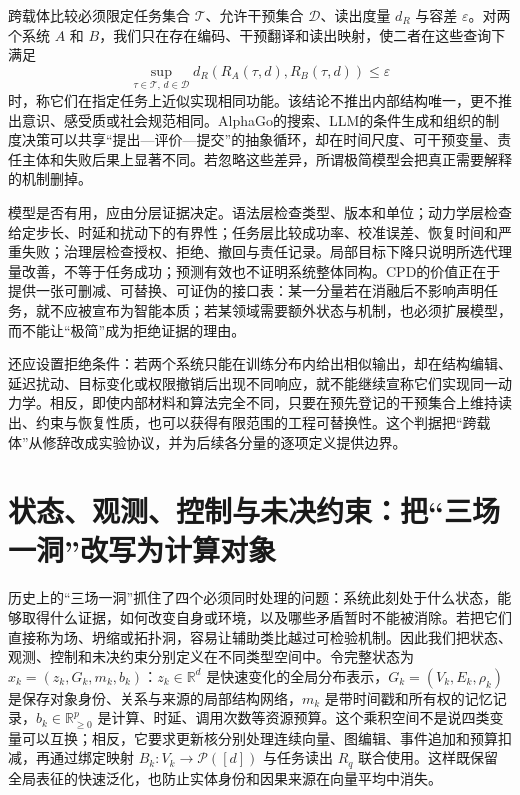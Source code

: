 跨载体比较必须限定任务集合 $\mathcal{T}$、允许干预集合 $\mathcal{D}$、读出度量 $d_R$ 与容差 $\varepsilon$。对两个系统 $A$ 和 $B$，我们只在存在编码、干预翻译和读出映射，使二者在这些查询下满足
\[
  \sup_{\tau\in\mathcal{T},\,d\in\mathcal{D}}
  d_R\!\left(R_A(\tau,d),R_B(\tau,d)\right)\leq\varepsilon
\]
时，称它们在指定任务上近似实现相同功能。该结论不推出内部结构唯一，更不推出意识、感受质或社会规范相同。AlphaGo的搜索、LLM的条件生成和组织的制度决策可以共享“提出—评价—提交”的抽象循环，却在时间尺度、可干预变量、责任主体和失败后果上显著不同。若忽略这些差异，所谓极简模型会把真正需要解释的机制删掉。

模型是否有用，应由分层证据决定。语法层检查类型、版本和单位；动力学层检查给定步长、时延和扰动下的有界性；任务层比较成功率、校准误差、恢复时间和严重失败；治理层检查授权、拒绝、撤回与责任记录。局部目标下降只说明所选代理量改善，不等于任务成功；预测有效也不证明系统整体同构。CPD的价值正在于提供一张可删减、可替换、可证伪的接口表：某一分量若在消融后不影响声明任务，就不应被宣布为智能本质；若某领域需要额外状态与机制，也必须扩展模型，而不能让“极简”成为拒绝证据的理由。

还应设置拒绝条件：若两个系统只能在训练分布内给出相似输出，却在结构编辑、延迟扰动、目标变化或权限撤销后出现不同响应，就不能继续宣称它们实现同一动力学。相反，即使内部材料和算法完全不同，只要在预先登记的干预集合上维持读出、约束与恢复性质，也可以获得有限范围的工程可替换性。这个判据把“跨载体”从修辞改成实验协议，并为后续各分量的逐项定义提供边界。

\section{状态、观测、控制与未决约束：把“三场一洞”改写为计算对象}
\label{sec:cpd_three_fields_one_hole}

历史上的“三场一洞”抓住了四个必须同时处理的问题：系统此刻处于什么状态，能够取得什么证据，如何改变自身或环境，以及哪些矛盾暂时不能被消除。若把它们直接称为场、坍缩或拓扑洞，容易让辅助类比越过可检验机制。因此我们把状态、观测、控制和未决约束分别定义在不同类型空间中。令完整状态为 $x_k=(z_k,G_k,m_k,b_k)$：$z_k\in\mathbb{R}^d$ 是快速变化的全局分布表示，$G_k=(V_k,E_k,\rho_k)$ 是保存对象身份、关系与来源的局部结构网络，$m_k$ 是带时间戳和所有权的记忆记录，$b_k\in\mathbb{R}_{\ge0}^p$ 是计算、时延、调用次数等资源预算。这个乘积空间不是说四类变量可以互换；相反，它要求更新核分别处理连续向量、图编辑、事件追加和预算扣减，再通过绑定映射 $B_k:V_k\to\mathcal{P}([d])$ 与任务读出 $R_q$ 联合使用。这样既保留全局表征的快速泛化，也防止实体身份和因果来源在向量平均中消失。

